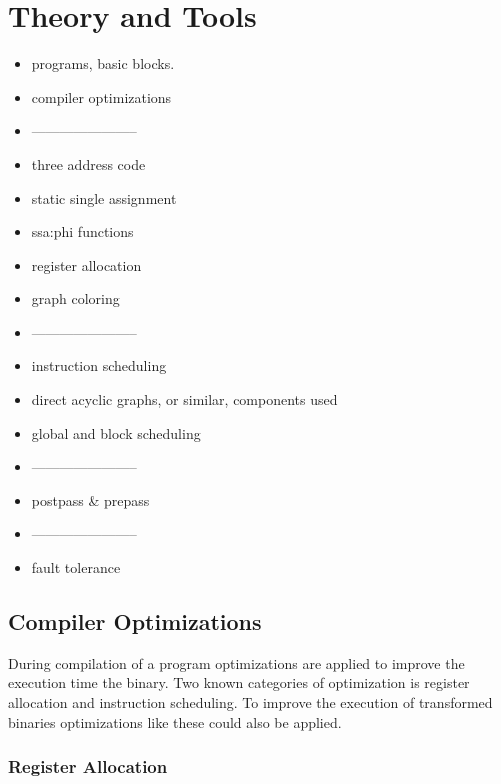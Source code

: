 \chapter{Theory and Tools}

\begin{itemize}
    \item programs, basic blocks.
    \item compiler optimizations
    \item -----------------------
    \item three address code
    \item static single assignment
    \item ssa:phi functions
    \item register allocation
    \item graph coloring 
    \item -----------------------
    \item instruction scheduling
    \item direct acyclic graphs, or similar, components used
    \item global and block scheduling
    \item -----------------------
    \item postpass \& prepass
    \item -----------------------
    
    \item fault tolerance

\end{itemize}



\section{Compiler Optimizations}
During compilation of a program optimizations are applied
to improve the execution time the binary. Two known categories
of optimization is register allocation and instruction scheduling.
To improve the execution of transformed binaries optimizations
like these could also be applied.

\subsection{Register Allocation}


